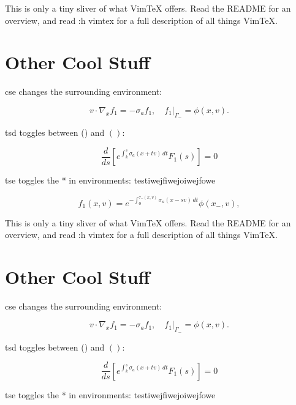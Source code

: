 \documentclass{article}
\begin{document}
This is only a tiny sliver of what VimTeX offers.
Read the README for an overview, and read :h vimtex for a full description of
all things VimTeX.




\section{Other Cool Stuff}

cse changes the surrounding environment:

\begin{equation}
  v \cdot \nabla_x f_1 = -\sigma_a f_1, \quad f_1 \rvert_{\Gamma_-} = \phi(x,v).
\end{equation}

tsd toggles between () and \( \left( \right) \):

\begin{equation*}
  \frac{d}{ds} \left[ e^{\int_k^s \sigma_a(x + tv)\,dt} F_1(s) \right] = 0
\end{equation*}

tse toggles the * in environments:
testiwejfiwejoiwejfowe

\begin{equation}
  f_1(x, v) = e^{-\int_0^{\tau_-(x, v)} \sigma_a(x - sv)\,dt} \phi(x_-, v),
\end{equation}

This is only a tiny sliver of what VimTeX offers.
Read the README for an overview, and read :h vimtex for a full description of
all things VimTeX.




\section{Other Cool Stuff}

cse changes the surrounding environment:

\begin{equation}
  v \cdot \nabla_x f_1 = -\sigma_a f_1, \quad f_1 \rvert_{\Gamma_-} = \phi(x,v).
\end{equation}

tsd toggles between () and \( \left( \right) \):

\begin{equation*}
  \frac{d}{ds} \left[ e^{\int_k^s \sigma_a(x + tv)\,dt} F_1(s) \right] = 0
\end{equation*}

tse toggles the * in environments:
testiwejfiwejoiwejfowe
\end{document}

